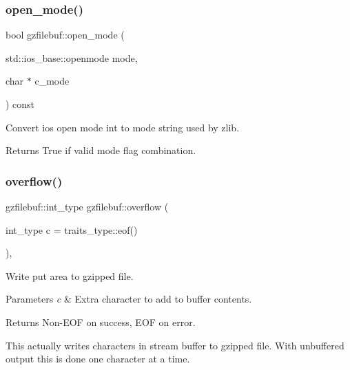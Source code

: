\subsubsection{\texorpdfstring{open\+\_\+mode()}{open\_mode()}\hspace{0.1cm}{\footnotesize\ttfamily [2/2]}}
{\footnotesize\ttfamily bool gzfilebuf\+::open\+\_\+mode (\begin{DoxyParamCaption}\item[{std\+::ios\+\_\+base\+::openmode}]{mode,  }\item[{char $\ast$}]{c\+\_\+mode }\end{DoxyParamCaption}) const\hspace{0.3cm}{\ttfamily [protected]}}



Convert ios open mode int to mode string used by zlib. 

\begin{DoxyReturn}{Returns}
True if valid mode flag combination. 
\end{DoxyReturn}
\mbox{\label{classgzfilebuf_a425a4b0d1890abff8f83d7a5aae344b4}} 
\subsubsection{\texorpdfstring{overflow()}{overflow()}\hspace{0.1cm}{\footnotesize\ttfamily [1/2]}}
{\footnotesize\ttfamily gzfilebuf\+::int\+\_\+type gzfilebuf\+::overflow (\begin{DoxyParamCaption}\item[{int\+\_\+type}]{c = {\ttfamily traits\+\_\+type\+:\+:eof()} }\end{DoxyParamCaption})\hspace{0.3cm}{\ttfamily [protected]}, {\ttfamily [virtual]}}



Write put area to gzipped file. 


\begin{DoxyParams}{Parameters}
{\em c} & Extra character to add to buffer contents. \\
\hline
\end{DoxyParams}
\begin{DoxyReturn}{Returns}
Non-\/\+E\+OF on success, E\+OF on error.
\end{DoxyReturn}
This actually writes characters in stream buffer to gzipped file. With unbuffered output this is done one character at a time. 

